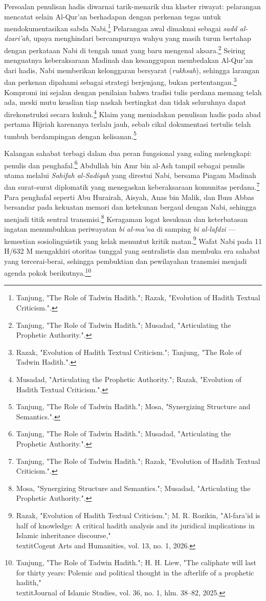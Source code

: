 Persoalan penulisan hadis diwarnai tarik-menarik dua klaster riwayat: pelarangan mencatat selain Al-Qur'an berhadapan dengan perkenan tegas untuk mendokumentasikan sabda Nabi.\footnote{Tanjung, "The Role of Tadwin Hadith."; Razak, "Evolution of Hadith Textual Criticism.".} Pelarangan awal dimaknai sebagai \textit{sadd al-dzari'ah}, upaya menghindari bercampurnya wahyu yang masih turun bertahap dengan perkataan Nabi di tengah umat yang baru mengenal aksara.\footnote{Tanjung, "The Role of Tadwin Hadith."; Musadad, "Articulating the Prophetic Authority.".} Seiring menguatnya keberaksaraan Madinah dan kesanggupan membedakan Al-Qur'an dari hadis, Nabi memberikan kelonggaran bersyarat (\textit{rukhsah}), sehingga larangan dan perkenan dipahami sebagai strategi berjenjang, bukan pertentangan.\footnote{Razak, "Evolution of Hadith Textual Criticism."; Tanjung, "The Role of Tadwin Hadith.".} Kompromi ini sejalan dengan penilaian bahwa tradisi tulis perdana memang telah ada, meski mutu keaslian tiap naskah bertingkat dan tidak seluruhnya dapat direkonstruksi secara kukuh.\footnote{Musadad, "Articulating the Prophetic Authority."; Razak, "Evolution of Hadith Textual Criticism.".} Klaim yang meniadakan penulisan hadis pada abad pertama Hijriah karenanya terlalu jauh, sebab cikal dokumentasi tertulis telah tumbuh berdampingan dengan kelisanan.\footnote{Tanjung, "The Role of Tadwin Hadith."; Mosa, "Synergizing Structure and Semantics.".}

Kalangan sahabat terbagi dalam dua peran fungsional yang saling melengkapi: penulis dan penghafal.\footnote{Tanjung, "The Role of Tadwin Hadith."; Musadad, "Articulating the Prophetic Authority.".} Abdullah bin Amr bin al-Ash tampil sebagai penulis utama melalui \textit{Sahifah al-Sadiqah} yang direstui Nabi, bersama Piagam Madinah dan surat-surat diplomatik yang menegaskan keberaksaraan komunitas perdana.\footnote{Tanjung, "The Role of Tadwin Hadith."; Razak, "Evolution of Hadith Textual Criticism.".} Para penghafal seperti Abu Hurairah, Aisyah, Anas bin Malik, dan Ibnu Abbas bersandar pada kekuatan memori dan ketekunan bergaul dengan Nabi, sehingga menjadi titik sentral transmisi.\footnote{Mosa, "Synergizing Structure and Semantics."; Musadad, "Articulating the Prophetic Authority.".} Keragaman logat kesukuan dan keterbatasan ingatan menumbuhkan periwayatan \textit{bi al-ma'na} di samping \textit{bi al-lafdzi} --- kemestian sosiolinguistik yang kelak menuntut kritik matan.\footnote{Razak, "Evolution of Hadith Textual Criticism."; M. R. Rozikin, "Al-fara'id is half of knowledge: A critical hadith analysis and its juridical implications in Islamic inheritance discourse," \\textit{Cogent Arts and Humanities}, vol. 13, no. 1, 2026.} Wafat Nabi pada 11 H/632 M mengakhiri otoritas tunggal yang sentralistis dan membuka era sahabat yang tercerai-berai, sehingga pembuktian dan pewilayahan transmisi menjadi agenda pokok berikutnya.\footnote{Tanjung, "The Role of Tadwin Hadith."; H. H. Liew, "The caliphate will last for thirty years: Polemic and political thought in the afterlife of a prophetic hadith," \\textit{Journal of Islamic Studies}, vol. 36, no. 1, hlm. 38--82, 2025.}


